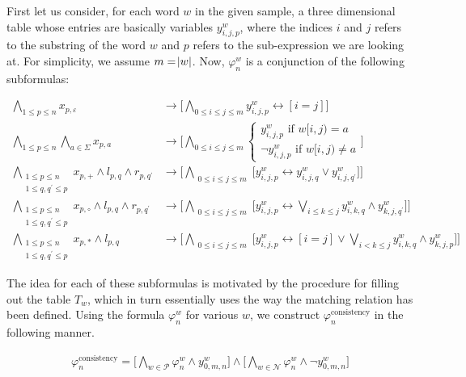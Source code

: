 First let us consider, for each word $w$ in the given sample, a three dimensional table whose entries are basically variables $y^w_{i,j,p}$, where the indices $i$ and $j$ refers to the substring of the word $w$ and $p$ refers to the sub-expression we are looking at. For simplicity, we assume $m=\abs{w}$. Now, $\varphi^w_n$ is a conjunction of the following subformulas:

\begin{align}
\bigwedge\limits_{1\leq p \leq n}x_{p,\varepsilon}&\rightarrow\Big[\bigwedge\limits_{0\leq i\leq j\leq m }y^w_{i,j,p}\leftrightarrow [i=j]\Big]\label{eq:sat5}\\
\bigwedge\limits_{1\leq p \leq n}\bigwedge\limits_{a\in \Sigma}x_{p,a}&\rightarrow\Big[\bigwedge\limits_{0\leq i\leq j\leq m }
\begin{cases}
y^w_{i,j,p}\text{ if }w[i,j)=a\\
\neg y^w_{i,j,p}\text{ if }w[i,j)\neq a
\end{cases}\Big]\label{eq:sat6}\\
\bigwedge\limits_{\substack{1\leq p \leq n \\ 1\leq q, q^{\prime}\leq p}}x_{p,+}\wedge l_{p,q}\wedge r_{p,q^{\prime}}&\rightarrow\Big[\bigwedge\limits_{\substack{0\leq i \leq j \leq m}}\Big[y^w_{i,j,p}\leftrightarrow y^w_{i,j,q}\vee y^w_{i,j,q^{\prime}}\Big]\Big]\label{eq:sat7}\\  
\bigwedge\limits_{\substack{1\leq p \leq n \\ 1\leq q, q^{\prime}\leq p}}x_{p,\circ}\wedge l_{p,q}\wedge r_{p,q^{\prime}}&\rightarrow\Big[\bigwedge\limits_{\substack{0\leq i\leq j \leq m }}\Big[y^w_{i,j,p}\leftrightarrow \bigvee\limits_{i\leq k\leq j}y^w_{i,k,q}\wedge y^w_{k,j,q^{\prime}}\Big]\Big]\label{eq:sat8} \\
\bigwedge\limits_{\substack{1\leq p \leq n \\ 1\leq q, q^{\prime}\leq p}}x_{p,*}\wedge l_{p,q}&\rightarrow\Big[\bigwedge\limits_{\substack{0\leq i \leq j \leq m}}\Big[y^w_{i,j,p}\leftrightarrow [i=j]\vee \bigvee\limits_{i< k\leq j}y^w_{i,k,q}\wedge y^w_{k,j,p}\Big]\Big] \label{eq:sat9}
\end{align}

The idea for each of these subformulas is motivated by the procedure for filling out the table $T_w$, which in turn essentially uses the way the matching relation has been defined. Using the formula $\varphi^w_n$ for various $w$, we construct $\varphi^\text{consistency}_n$ in the following manner.

\begin{align}
\varphi^\text{consistency}_n=\Big[\bigwedge\limits_{w\in \mathcal P} \varphi_n^{w} \wedge y^w_{0,m,n} \Big]\wedge \Big[\bigwedge\limits_{w\in \mathcal N} \varphi_n^{w} \wedge \neg y^w_{0,m,n} \Big]
\end{align}


